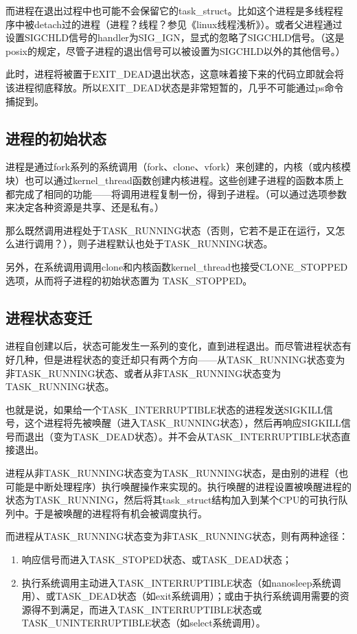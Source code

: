 \documentclass[doctor,openright,twoside]{sjtuthesis}
\providecommand{\tightlist}{%
    \setlength{\itemsep}{0pt}\setlength{\parskip}{0pt}}
\theoremstyle{plain}
\theoremstyle{definition}
\theoremstyle{remark}
\theoremstyle{ocrenumbox}
\theoremstyle{plain}
\begin{document}
而进程在退出过程中也可能不会保留它的task\_struct。比如这个进程是多线程程序中被detach过的进程（进程？线程？参见《linux线程浅析》）。或者父进程通过设置SIGCHLD信号的handler为SIG\_IGN，显式的忽略了SIGCHLD信号。（这是posix的规定，尽管子进程的退出信号可以被设置为SIGCHLD以外的其他信号。）

此时，进程将被置于EXIT\_DEAD退出状态，这意味着接下来的代码立即就会将该进程彻底释放。所以EXIT\_DEAD状态是非常短暂的，几乎不可能通过ps命令捕捉到。

\subsection{进程的初始状态}

进程是通过fork系列的系统调用（fork、clone、vfork）来创建的，内核（或内核模块）也可以通过kernel\_thread函数创建内核进程。这些创建子进程的函数本质上都完成了相同的功能------将调用进程复制一份，得到子进程。（可以通过选项参数来决定各种资源是共享、还是私有。）

那么既然调用进程处于TASK\_RUNNING状态（否则，它若不是正在运行，又怎么进行调用？），则子进程默认也处于TASK\_RUNNING状态。

另外，在系统调用调用clone和内核函数kernel\_thread也接受CLONE\_STOPPED选项，从而将子进程的初始状态置为
TASK\_STOPPED。

\subsection{进程状态变迁}

进程自创建以后，状态可能发生一系列的变化，直到进程退出。而尽管进程状态有好几种，但是进程状态的变迁却只有两个方向------从TASK\_RUNNING状态变为非TASK\_RUNNING状态、或者从非TASK\_RUNNING状态变为TASK\_RUNNING状态。

也就是说，如果给一个TASK\_INTERRUPTIBLE状态的进程发送SIGKILL信号，这个进程将先被唤醒（进入TASK\_RUNNING状态），然后再响应SIGKILL信号而退出（变为TASK\_DEAD状态）。并不会从TASK\_INTERRUPTIBLE状态直接退出。

进程从非TASK\_RUNNING状态变为TASK\_RUNNING状态，是由别的进程（也可能是中断处理程序）执行唤醒操作来实现的。执行唤醒的进程设置被唤醒进程的状态为TASK\_RUNNING，然后将其task\_struct结构加入到某个CPU的可执行队列中。于是被唤醒的进程将有机会被调度执行。

而进程从TASK\_RUNNING状态变为非TASK\_RUNNING状态，则有两种途径：

\begin{enumerate}
\def\labelenumi{\arabic{enumi}.}
\tightlist
\item
  响应信号而进入TASK\_STOPED状态、或TASK\_DEAD状态；
\item
  执行系统调用主动进入TASK\_INTERRUPTIBLE状态（如nanosleep系统调用）、或TASK\_DEAD状态（如exit系统调用）；或由于执行系统调用需要的资源得不到满足，而进入TASK\_INTERRUPTIBLE状态或TASK\_UNINTERRUPTIBLE状态（如select系统调用）。
\end{enumerate}
\end{document}

